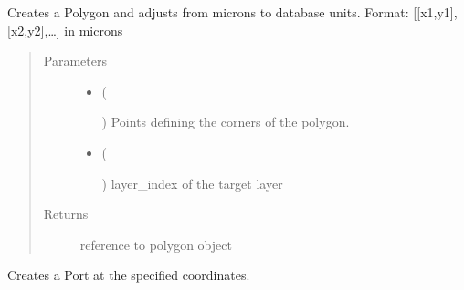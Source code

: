 \documentclass[a4paper,10pt,english]{sphinxmanual}
\begin{document}
\begin{fulllineitems}

\begin{fulllineitems}
\label{\detokenize{photonics/photonics:kppc.photonics.PhotDevice.create_polygon}}
Creates a Polygon and adjusts from microns to database units. Format: {[}{[}x1,y1{]},{[}x2,y2{]},…{]} in microns
\begin{quote}\begin{description}
\item[{Parameters}] \leavevmode\begin{itemize}
\item {} 
 (%
\begin{footnote}[50]\sphinxAtStartFootnote
{}
%
\end{footnote}) \textendash{} Points defining the corners of the polygon.

\item {} 
 (%
\begin{footnote}[51]\sphinxAtStartFootnote
{}
%
\end{footnote}) \textendash{} layer\_index of the target layer

\end{itemize}

\item[{Returns}] \leavevmode
reference to polygon object

\end{description}\end{quote}

\end{fulllineitems}


\begin{fulllineitems}
\label{\detokenize{photonics/photonics:kppc.photonics.PhotDevice.create_port}}
Creates a Port at the specified coordinates.


\end{fulllineitems}
\end{fulllineitems}
\end{document}
